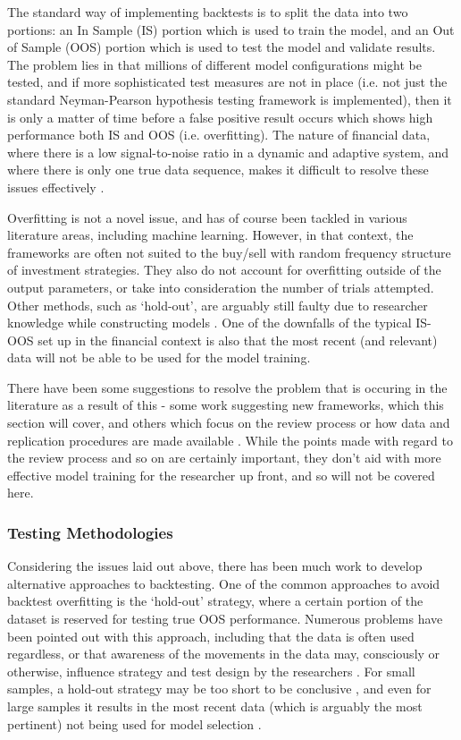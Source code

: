 \documentclass[a4paper,latin]{paper}
\begin{document}
The standard way of implementing backtests is to split the data into two portions: an In Sample (IS) portion which
 is used to train the model, and an Out of Sample (OOS) portion which is used to test the model and validate results. 
 The problem lies in that millions of different model configurations might be tested, and if more sophisticated test 
 measures are not in place (i.e. not just the standard Neyman-Pearson hypothesis testing framework is implemented), 
 then it is only a matter of time before a false positive result occurs which shows high performance both IS and OOS (i.e. overfitting). 
 The nature of financial data, where there is a low signal-to-noise ratio in a dynamic and adaptive system, and 
 where there is only one true data sequence, makes it difficult to resolve these issues effectively 
\cite{BailyPBO, McLean}.
\hfill \break 

Overfitting is not a novel issue, and has of course been tackled in various literature areas, including machine learning. 
However, in that context, the frameworks are often not suited to the buy/sell with random frequency structure of 
investment strategies. They also do not account for overfitting outside of the output parameters, or take into 
consideration the number of trials attempted. Other methods, such as ‘hold-out’, are arguably still faulty due to researcher 
knowledge while constructing models \cite{Schorfheide}. One of the downfalls of the typical IS-OOS set up in the 
financial context is also that the most recent (and relevant) data will not be able to be used for the model training. 
\hfill \break 

There have been some suggestions to resolve the problem that is occuring in the literature as a result of this - some 
work suggesting new frameworks, which this section will cover, and others which focus on the review process or 
how data and replication procedures are made available \cite{Prado}. While the points made with regard to the review process 
and so on are certainly important, they don't aid with more effective model training for the researcher up front, and 
so will not be covered here.

\subsubsection{Testing Methodologies}\label{lr_cscv}

Considering the issues laid out above, there has been much work to develop alternative approaches to backtesting. 
One of the common approaches to avoid backtest overfitting is the ‘hold-out’ strategy, where a certain portion of 
the dataset is reserved for testing true OOS performance. Numerous problems have been pointed out with this 
approach, including that the data is often used regardless, or that awareness of the movements in the data may, 
consciously or otherwise, influence strategy and test design by the researchers \cite{Schorfheide}. For small samples, 
a hold-out strategy may be too short to be conclusive \cite{Weiss}, and even for large samples it results in the 
most recent data (which is arguably the most pertinent) not being used for model selection \cite{Hawkins, BailyPBO}.
\hfill \break 
\end{document}
